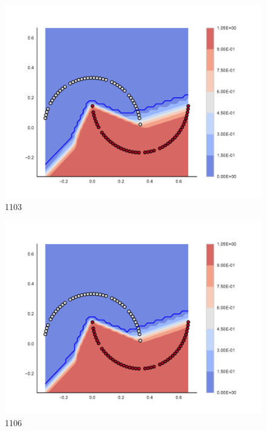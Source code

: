 \begin{subfigure}[b]{0.09\textwidth}
    \includegraphics[clip, trim=2.35cm 1.75cm 4.5cm 0cm,width=\textwidth]{img/convergence/1103.pdf}
    \caption{1103}
    \label{fig:convergence_1103}
\end{subfigure}
%
\begin{subfigure}[b]{0.09\textwidth}
    \includegraphics[clip, trim=2.35cm 1.75cm 4.5cm 0cm,width=\textwidth]{img/convergence/1106.pdf}
    \caption{1106}
    \label{fig:convergence_1106}
\end{subfigure}
%
